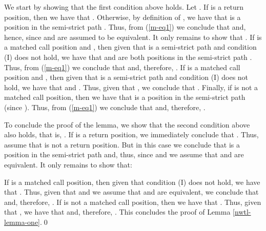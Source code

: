 \documentclass{LMCS}
\theoremstyle{plain}
\theoremstyle{definition}
\begin{document}
\begin{enumerate}[(a)]
We start by showing that the first condition above holds.  Let . If  is a return position, then we have that . Otherwise, by definition of
, we have that  is a position in the
semi-strict path . Thus, from
(\ref{m-eq1}) we conclude that  and, hence,
 since  and
 are assumed to be equivalent. It only remains to show
that . If
 is a matched call position and , then given that
 is a semi-strict path and condition
(I) does not hold, we have that  and  are both
positions in the semi-strict path . Thus, from (\ref{m-eq1}) we conclude that  and, therefore, . If  is a matched call position and ,
then given that  is a semi-strict
path and condition (I) does not hold, we have that  and . Thus, given that , we conclude that . Finally, if  is not a matched
call position, then we have that  is a position in the
semi-strict path  (since ). Thus, from
(\ref{m-eq1}) we conclude that  and,
therefore, .   

To conclude the proof of the lemma, we show that the second condition
above also holds, that is, . If  is a return position, we immediately
conclude that . Thus, assume that  is not a return position. But
in this case we conclude that  is a position in the
semi-strict path  and, thus,
 since  and we assume that  and  are
equivalent. It only remains to show that:

If  is a matched call position, then given that condition
(I) does not hold, we have that . Thus, given that  and we assume that  and  are
equivalent, we conclude that  and, therefore, . If  is not a matched call position, then we
have that . Thus, given that , we have that  and, therefore, . This concludes the proof of Lemma \ref{nwtl-lemma-one}.\qed
\end{enumerate}
\end{document}
